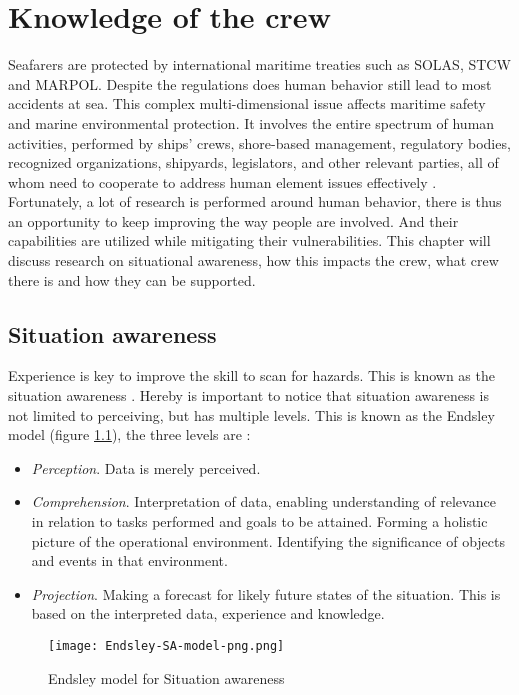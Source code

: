 \chapter{Knowledge of the crew}
\label{sec:knowledge}
Seafarers are protected by international maritime treaties such as \ac{SOLAS}, \ac{STCW} and \ac{MARPOL}. Despite the regulations does human behavior still lead to most accidents at sea. This complex multi-dimensional issue affects maritime safety and marine environmental protection. It involves the entire spectrum of human activities, performed by ships' crews, shore-based management, regulatory bodies, recognized organizations, shipyards, legislators, and other relevant parties, all of whom need to cooperate to address human element issues effectively \cite{IMO2017}.
Fortunately, a lot of research is performed around human behavior, there is thus an opportunity to keep improving the way people are involved. And their capabilities are utilized while mitigating their vulnerabilities.
This chapter will discuss research on situational awareness, how this impacts the crew, what crew there is and how they can be supported.

\section{Situation awareness}
Experience is key to improve the skill to scan for hazards. This is known as the situation awareness \cite{Underwood2013}. Hereby is important to notice that situation awareness is not limited to perceiving, but has multiple levels. This is known as the Endsley model (figure \ref{fig:Endsley-SA-model}), the three levels are \cite{Kalloniatis2017}: 
\begin{itemize}
	\item \emph{Perception}. Data is merely perceived.
	\item \emph{Comprehension}. Interpretation of data, enabling understanding of relevance in relation to tasks performed and goals to be attained. Forming a holistic picture of the operational environment. Identifying the significance of objects and events in that environment.
	\item \emph{Projection}. Making a forecast for likely future states of the situation. This is based on the interpreted data, experience and knowledge.
\end{itemize}

\begin{figure}[H]
	\centering
	\texttt{[image: Endsley-SA-model-png.png]}
	\caption{Endsley model for Situation awareness}
	\label{fig:Endsley-SA-model}
\end{figure}


